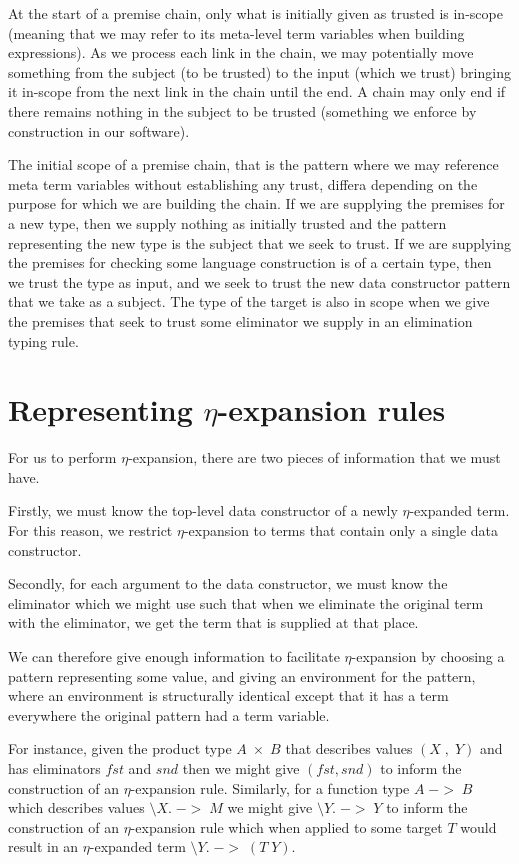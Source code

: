 At the start of a premise chain, only what is initially given as
trusted is in-scope (meaning that we may refer to its meta-level term
variables when building expressions). As we process each link in the
chain, we may potentially move something from the subject (to be
trusted) to the input (which we trust) bringing it in-scope from the
next link in the chain until the end. A chain may only end if there
remains nothing in the subject to be trusted (something we
enforce by construction in our software).

The initial scope of a premise chain, that is the pattern where we
may reference meta term variables without establishing any trust,
differa depending on the purpose for which we are building the
chain. If we are supplying the premises for a new type, then we supply
nothing as initially trusted and the pattern representing the new type
is the subject that we seek to trust. If we are supplying the premises
for checking some language construction is of a certain type, then we
trust the type as input, and  we seek to trust the new data
constructor pattern that we take as a subject. The type of the target
is also in scope when we give the premises that seek to trust some
eliminator we supply in an elimination typing rule.

\section{Representing $\eta$-expansion rules}
\label{DSL-eta-rules}

For us to perform $\eta$-expansion, there are two pieces of
information that we must have.

Firstly, we must know the top-level data constructor of a newly
$\eta$-expanded term. For this reason, we restrict $\eta$-expansion to
terms that contain only a single data constructor.

Secondly, for each argument to the data constructor, we must know the
eliminator which we might use such that when we eliminate the original
term with the eliminator, we get the term that is supplied at that
place. 

We can therefore give enough information to facilitate
$\eta$-expansion by choosing a pattern representing some value, and
giving an environment for the pattern, where an environment is
structurally identical except that it has a term everywhere the
original pattern had a term variable.

For instance, given the product type $A\;×\;B$ that describes values
$(X \;,\; Y)$ and has eliminators $fst$ and $snd$ then we might give $(fst
, snd)$ to inform the construction of an $\eta$-expansion rule. Similarly,
for a function type $A \; -> \; B$ which describes values $\setminus
X. \; -> \; M$  we might give $\setminus Y. \; -> \; Y$ to inform the
construction of an $\eta$-expansion rule which when applied to some
target $T$ would result in an $\eta$-expanded term
$\setminus Y. \; -> \; (T \; Y)$.

